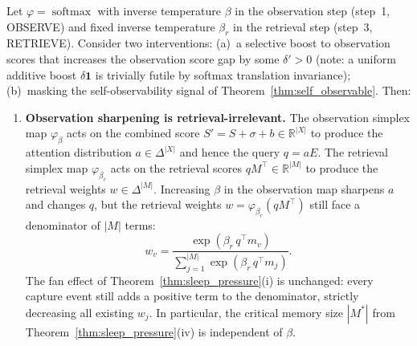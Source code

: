 \begin{theorem}
\label{thm:score_boost}
\leanok
{}
Let $\varphi = \operatorname{softmax}$ with inverse temperature $\beta$ in the observation step (step~1, OBSERVE) and fixed inverse temperature $\beta_r$ in the retrieval step (step~3, RETRIEVE).  Consider two interventions: (a)~a selective boost to observation scores that increases the observation score gap by some $\delta' > 0$ (note: a uniform additive boost $\delta\mathbf{1}$ is trivially futile by softmax translation invariance); (b)~masking the self-observability signal of Theorem~\ref{thm:self_observable}.  Then:

\begin{enumerate}
\item \textbf{Observation sharpening is retrieval-irrelevant.}  The observation simplex map $\varphi_\beta$ acts on the combined score $S' = S + \sigma + b \in \mathbb{R}^{|X|}$ to produce the attention distribution $a \in \Delta^{|X|}$ and hence the query $q = aE$.  The retrieval simplex map $\varphi_{\beta_r}$ acts on the retrieval scores $qM^\top \in \mathbb{R}^{|M|}$ to produce the retrieval weights $w \in \Delta^{|M|}$.  Increasing $\beta$ in the observation map sharpens $a$ and changes $q$, but the retrieval weights $w = \varphi_{\beta_r}(qM^\top)$ still face a denominator of $|M|$ terms:
\[
w_v = \frac{\exp(\beta_r\,q^\top m_v)}{\sum_{j=1}^{|M|}\exp(\beta_r\,q^\top m_j)}.
\]
The fan effect of Theorem~\ref{thm:sleep_pressure}(i) is unchanged: every capture event still adds a positive term to the denominator, strictly decreasing all existing $w_j$.  In particular, the critical memory size $|M^*|$ from Theorem~\ref{thm:sleep_pressure}(iv) is independent of $\beta$.


\end{enumerate}
\end{theorem}
